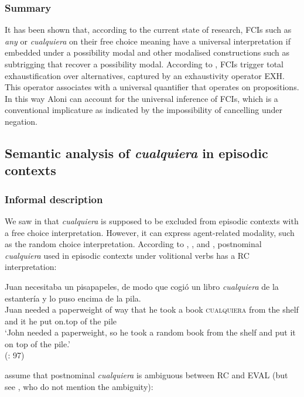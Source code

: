 \subsubsection{{Summary}} \label{sec:2.2.2.3}

It has been shown that, according to the current state of research, FCIs such as \textit{any} or \textit{cualquiera} on their free choice meaning have a universal interpretation if embedded under a possibility modal and other modalised constructions such as subtrigging that recover a possibility modal. According to \citet{Aloni2007}, FCIs trigger total exhaustification over alternatives, captured by an exhaustivity operator EXH. This operator associates with a universal quantifier that operates on propositions. In this way Aloni can account for the universal inference of FCIs, which is a conventional implicature as indicated by the impossibility of cancelling under negation.

\subsection{{Semantic} {analysis} {of} {\textit{cualquiera}} {in} {episodic} {contexts}}  \label{sec:2.2.3}
\subsubsection{{Informal description}} \label{sec:2.2.3.1}

We saw in  that \textit{cualquiera} is supposed to be excluded from episodic contexts with a free choice interpretation. However, it can express agent-related modality, such as the random choice interpretation. According to \citet{ChoiRomero2008}, \citet{ChoiRomero2008}, and \citet{Alonso-OvalleMenéndez-Benito2011,am2018}, postnominal \textit{cualquiera} used in episodic contexts under volitional verbs has a RC interpretation:

\ea \label{ex:key:87} %
  \gll Juan necesitaba un pisapapeles, de modo que cogió un libro \textit{cualquiera} de la estantería y lo puso encima de la pila.\\
  Juan needed a paperweight of way that {he took} a book \textsc{cualquiera} from the shelf and it {he put} on.top of the pile\\
  \glt ‘John needed a paperweight, so he took a random book from the shelf and put it on top of the pile.’\\
  (\citealt{ChoiRomero2008}: 97)
\z

\citet{Alonso-OvalleMenéndez-Benito2011,am2018} assume that postnominal \textit{cualquiera} is ambiguous between RC and EVAL (but see \citealt{ChoiRomero2008}, who do not mention the ambiguity):

